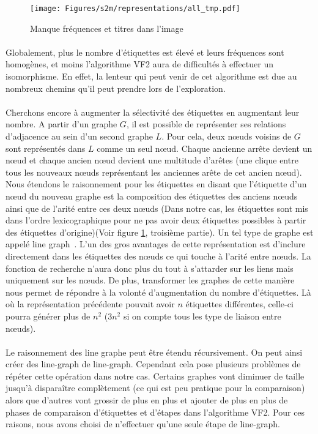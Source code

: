 \documentclass[12pt,french,twoside]{report}
\begin{document}
\begin{figure}
  \texttt{[image: Figures/s2m/representations/all\_tmp.pdf]}
  \caption{\label{representations}Manque fréquences et titres dans l'image}
\end{figure}

\paragraph{}Globalement, plus le nombre d'étiquettes est élevé et leurs fréquences sont homogènes, et moins l'algorithme VF2 aura de
difficultés à effectuer un isomorphisme. En effet, la lenteur qui peut venir de cet algorithme est due au nombreux chemins qu'il
peut prendre lors de l'exploration.

\paragraph{}Cherchons encore à augmenter la sélectivité des étiquettes en augmentant leur nombre. A partir d'un graphe $G$, il est
possible de représenter ses relations d'adjacence au sein d'un second graphe $L$. Pour cela, deux n\oe{}uds voisins de $G$ sont
représentés dans $L$ comme un seul n\oe{}ud. Chaque ancienne arrête devient un n\oe{}ud et chaque ancien n\oe{}ud devient une multitude
d'arêtes (une clique entre tous les nouveaux n\oe{}uds représentant les anciennes arête de cet ancien n\oe{}ud). Nous étendons le 
raisonnement pour les étiquettes en disant que l'étiquette d'un n\oe{}ud du nouveau graphe est la composition des étiquettes des anciens
n\oe{}uds ainsi que de l'arité entre ces deux n\oe{}uds (Dans notre cas, les étiquettes sont mis dans l'ordre lexicographique pour ne pas
avoir deux étiquettes possibles à partir des étiquettes d'origine)(Voir figure \ref{representations},
troisième partie). Un tel type de graphe est appelé line graph~\cite{orlin_line-digraphs_1978}. L'un des
gros avantages de cette représentation est d'inclure directement dans les étiquettes des n\oe{}uds ce qui touche à l'arité entre n\oe{}uds.
La fonction
de recherche n'aura donc plus du tout à s'attarder sur les liens mais uniquement sur les n\oe{}uds. De plus, transformer les graphes
de cette manière nous permet de répondre à la volonté d'augmentation du nombre d'étiquettes. Là où la représentation précédente
pouvait avoir $n$ étiquettes différentes, celle-ci pourra générer plus de $n^2$ ($3n^2$ si on compte tous les type de liaison entre
n\oe{}uds).

\paragraph{}Le raisonnement des line graphe peut être étendu récursivement. On peut ainsi créer des line-graph de line-graph.
Cependant cela pose plusieurs problèmes de répéter cette opération dans notre cas. Certains graphes vont diminuer de taille
jusqu'à disparaître complètement (ce qui est peu pratique pour la comparaison) alors que d'autres vont grossir de plus en plus
et ajouter de plus en plus de phases de comparaison d'étiquettes et d'étapes dans l'algorithme VF2. Pour ces raisons, nous avons
choisi de n'effectuer qu'une seule étape de line-graph.
\end{document}
